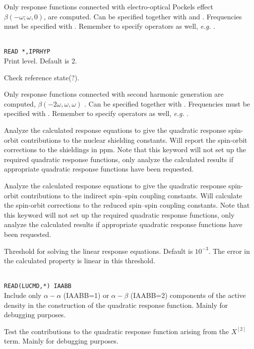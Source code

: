 \begin{description}
\item{}
Only response functions connected with electro-optical
Pockels effect
$\beta(-\omega; \omega,0)$, are computed.
Can be specified together with  and .
Frequencies must be specified with .
Remember to specify operators as well, {\it e.g.\/} .

\item{}\\
\verb|READ *,IPRHYP|\\
Print level. Default is 2.

\item{} Check reference state(?).

\item{}
Only response functions connected with second harmonic
generation
are computed, $\beta(-2\omega,\omega,\omega)$ .
Can be specified together with .
Frequencies must be specified with .
Remember to specify operators as well, {\it e.g.\/} .

\item{}
Analyze the calculated response equations to give the quadratic
response spin-orbit contributions to the nuclear shielding
constants. Will report the spin-orbit corrections to the shieldings in
ppm. Note that this keyword will not set up the required quadratic
response functions, only analyze the calculated results if appropriate
quadratic response functions have been requested.

\item{}
Analyze the calculated response equations to give the quadratic
response spin-orbit contributions to the indirect spin--spin coupling
constants. Will calculate the spin-orbit corrections to the reduced spin--spin
coupling constants. Note that this keyword will not set up the
required quadratic
response functions, only analyze the calculated results if appropriate
quadratic response functions have been requested.

\item{}
Threshold for solving the linear response equations.
Default is $10^{-3}$. The error in the calculated property is linear
in this threshold.

\item{}\\
\verb|READ(LUCMD,*) IAABB|\\
Include only $\alpha-\alpha$ (IAABB=1) or $\alpha-\beta$ (IAABB=2)
components of the active density in the construction of the quadratic
response function. Mainly for debugging purposes.

\item{}
Test the contributions to the quadratic response function arising from
the $X^{\left[2\right]}$ term. Mainly for debugging purposes.

\end{description}

